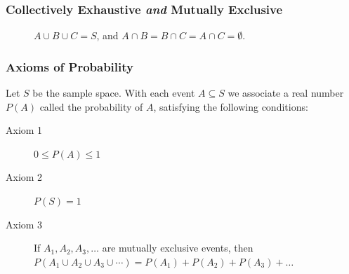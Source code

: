 \documentclass[handout]{beamer}
\begin{document}
\begin{frame}
\frametitle{Collectively Exhaustive \emph{and} Mutually Exclusive}
\begin{figure}
\centering
{}
\caption{$A \cup B \cup C = S$, and $A \cap B = B\cap C = A \cap C = \emptyset$.}
\end{figure}
\end{frame}


\begin{frame}
\frametitle{Axioms of Probability}
Let $S$ be the sample space. With each event $A \subseteq S$ we associate a real number $P(A)$ called the \alert{probability of $A$}, satisfying the following conditions:
\vspace{1em}
\pause
\begin{description}
	\item[Axiom 1] $0 \leq P(A) \leq 1$\pause
	\item[Axiom 2] $P(S)=1$\pause
	\item[Axiom 3] If $A_1, A_2, A_3, \hdots$ are mutually exclusive events, then $P(A_1\cup A_2 \cup A_3 \cup \cdots) = P(A_1) + P(A_2) + P(A_3) + \hdots$
\end{description}

\end{frame}
\end{document}
